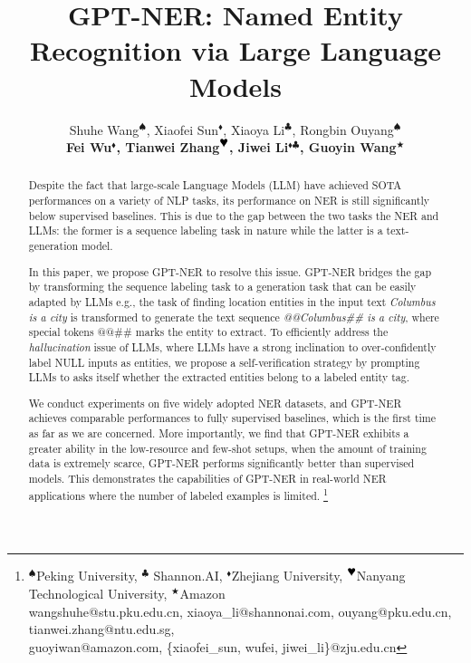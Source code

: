 \documentclass{article}
\title{GPT-NER: Named Entity Recognition via Large Language Models}
\author{
Shuhe Wang$^{\spadesuit}$,
Xiaofei Sun$^{\blacklozenge}$,
Xiaoya Li$^{\clubsuit}$,
Rongbin Ouyang$^{\spadesuit}$\\
{\bf Fei Wu$^{\blacklozenge}$,
Tianwei Zhang$^{\heart}$,
Jiwei Li$^{\blacklozenge\clubsuit}$,
Guoyin Wang$^{\bigstar}$} \\
}
\newcommand{\heart}{\text{\small \ding{170}}}
\begin{document}
\maketitle


\begin{abstract}

Despite the fact that
large-scale Language Models (LLM)  
have achieved SOTA performances on a variety of NLP tasks, 
its performance on NER is still significantly below supervised baselines. This is due
to the gap between the two tasks the NER and LLMs: the former is a sequence labeling task in nature while the latter is a text-generation model. 

In this paper, we propose GPT-NER to resolve this issue. 
GPT-NER bridges the gap by transforming the sequence labeling task  
to a generation task that can be easily adapted by 
  LLMs
e.g., the task of finding location entities in the input text {\it Columbus is a city}
is transformed to generate the text sequence 
\textit{@@Columbus\#\# is a city}, where special tokens @@\#\# marks the entity to extract. 
To efficiently 
address the {\it hallucination} issue of LLMs, where LLMs have a strong inclination to over-confidently label NULL inputs as entities, 
we propose a self-verification strategy
by prompting LLMs to 
 asks itself whether the extracted entities belong to a labeled entity tag.

We conduct experiments on five widely adopted NER datasets, and 
GPT-NER achieves comparable performances to fully supervised baselines, which is the first time as far as we are concerned.
More importantly, we find that GPT-NER exhibits a greater ability
 in the low-resource and few-shot setups, when the amount of training data is extremely scarce,   GPT-NER performs significantly better than supervised models.
This demonstrates the capabilities of GPT-NER 
in real-world NER applications where the number of labeled examples is limited. \footnote{\noindent $^{\spadesuit}$Peking University, $^{\clubsuit}$ Shannon.AI, $^{\blacklozenge}$Zhejiang University,
 $^{\heart}$Nanyang Technological University, $^{\bigstar}$Amazon \\
 wangshuhe@stu.pku.edu.cn, xiaoya\_li@shannonai.com, ouyang@pku.edu.cn, tianwei.zhang@ntu.edu.sg, \\ guoyiwan@amazon.com, \{xiaofei\_sun, wufei, jiwei\_li\}@zju.edu.cn
}

\end{abstract}
\end{document}
